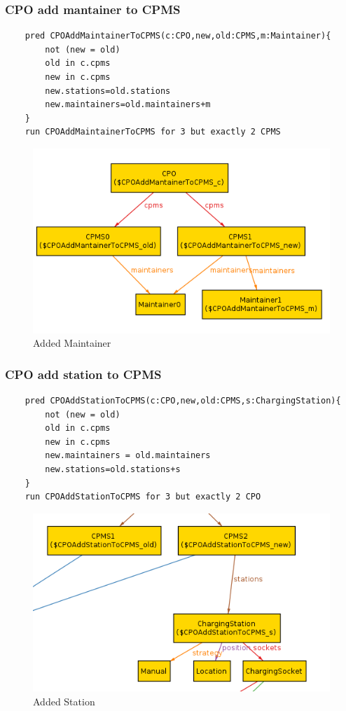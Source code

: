 \subsubsection{CPO add mantainer to CPMS}
\begin{verbatim}
    pred CPOAddMaintainerToCPMS(c:CPO,new,old:CPMS,m:Maintainer){
        not (new = old)
        old in c.cpms
        new in c.cpms
        new.stations=old.stations
        new.maintainers=old.maintainers+m
    }
    run CPOAddMaintainerToCPMS for 3 but exactly 2 CPMS   
\end{verbatim}
\begin{figure}[H]
    \includegraphics[keepaspectratio, width=16cm]{Alloy/CpoAddMaintainer.png}
    \caption{Added Maintainer}
\end{figure}

\subsubsection{CPO add station to CPMS}
\begin{verbatim}
    pred CPOAddStationToCPMS(c:CPO,new,old:CPMS,s:ChargingStation){
        not (new = old)
        old in c.cpms
        new in c.cpms
        new.maintainers = old.maintainers
        new.stations=old.stations+s
    }
    run CPOAddStationToCPMS for 3 but exactly 2 CPO    
\end{verbatim}
\begin{figure}[H]
    \includegraphics[keepaspectratio, width=16cm]{Alloy/CpoAddStation.png}
    \caption{Added Station}
\end{figure}

